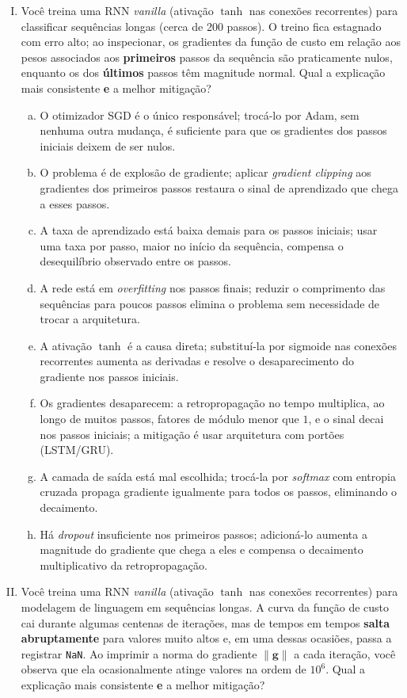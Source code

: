 \documentclass{dlproblemset}
\begin{document}
\begin{enumerate}[I)]
    \item Você treina uma RNN \textit{vanilla} (ativação $\tanh$ nas conexões recorrentes) para classificar sequências longas (cerca de 200 passos). O treino fica estagnado com erro alto; ao inspecionar, os gradientes da função de custo em relação aos pesos associados aos \textbf{primeiros} passos da sequência são praticamente nulos, enquanto os dos \textbf{últimos} passos têm magnitude normal. Qual a explicação mais consistente \textbf{e} a melhor mitigação?
    \begin{enumerate}[a)]
        \item O otimizador SGD é o único responsável; trocá-lo por Adam, sem nenhuma outra mudança, é suficiente para que os gradientes dos passos iniciais deixem de ser nulos.
        \item O problema é de explosão de gradiente; aplicar \textit{gradient clipping} aos gradientes dos primeiros passos restaura o sinal de aprendizado que chega a esses passos.
        \item A taxa de aprendizado está baixa demais para os passos iniciais; usar uma taxa por passo, maior no início da sequência, compensa o desequilíbrio observado entre os passos.
        \item A rede está em \textit{overfitting} nos passos finais; reduzir o comprimento das sequências para poucos passos elimina o problema sem necessidade de trocar a arquitetura.
        \item A ativação $\tanh$ é a causa direta; substituí-la por sigmoide nas conexões recorrentes aumenta as derivadas e resolve o desaparecimento do gradiente nos passos iniciais.
        \item Os gradientes desaparecem: a retropropagação no tempo multiplica, ao longo de muitos passos, fatores de módulo menor que $1$, e o sinal decai nos passos iniciais; a mitigação é usar arquitetura com portões (LSTM/GRU).
        \item A camada de saída está mal escolhida; trocá-la por \textit{softmax} com entropia cruzada propaga gradiente igualmente para todos os passos, eliminando o decaimento.
        \item Há \textit{dropout} insuficiente nos primeiros passos; adicioná-lo aumenta a magnitude do gradiente que chega a eles e compensa o decaimento multiplicativo da retropropagação.
    \end{enumerate}

    \item Você treina uma RNN \textit{vanilla} (ativação $\tanh$ nas conexões recorrentes) para modelagem de linguagem em sequências longas. A curva da função de custo cai durante algumas centenas de iterações, mas de tempos em tempos \textbf{salta abruptamente} para valores muito altos e, em uma dessas ocasiões, passa a registrar \texttt{NaN}. Ao imprimir a norma do gradiente $\|\mathbf{g}\|$ a cada iteração, você observa que ela ocasionalmente atinge valores na ordem de $10^{6}$. Qual a explicação mais consistente \textbf{e} a melhor mitigação?


\end{enumerate}
\end{document}
